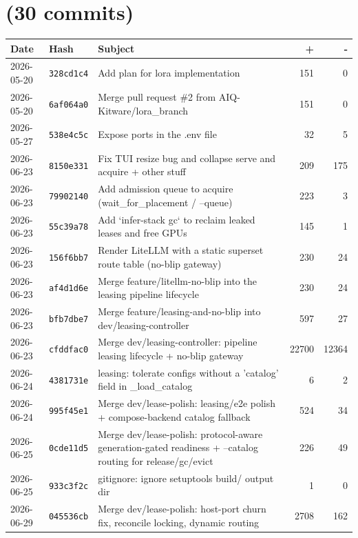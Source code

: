 \section*{ (30 commits)}
\begin{longtable}{@{}p{}p{}p{}r r@{}}
\toprule Date & Hash & Subject & + & - \\ \midrule\endhead
2026-05-20 & \texttt{328cd1c4} & Add plan for lora implementation & 151 & 0 \\
2026-05-20 & \texttt{6af064a0} & Merge pull request \#2 from AIQ-Kitware/lora\_branch & 151 & 0 \\
2026-05-27 & \texttt{538e4c5c} & Expose ports in the .env file & 32 & 5 \\
2026-06-23 & \texttt{8150e331} & Fix TUI resize bug and collapse serve and acquire + other stuff & 209 & 175 \\
2026-06-23 & \texttt{79902140} & Add admission queue to acquire (wait\_for\_placement / --queue) & 223 & 3 \\
2026-06-23 & \texttt{55c39a78} & Add `infer-stack gc` to reclaim leaked leases and free GPUs & 145 & 1 \\
2026-06-23 & \texttt{156f6bb7} & Render LiteLLM with a static superset route table (no-blip gateway) & 230 & 24 \\
2026-06-23 & \texttt{af4d1d6e} & Merge feature/litellm-no-blip into the leasing pipeline lifecycle & 230 & 24 \\
2026-06-23 & \texttt{bfb7dbe7} & Merge feature/leasing-and-no-blip into dev/leasing-controller & 597 & 27 \\
2026-06-23 & \texttt{cfddfac0} & Merge dev/leasing-controller: pipeline leasing lifecycle + no-blip gateway & 22700 & 12364 \\
2026-06-24 & \texttt{4381731e} & leasing: tolerate configs without a 'catalog' field in \_load\_catalog & 6 & 2 \\
2026-06-24 & \texttt{995f45e1} & Merge dev/lease-polish: leasing/e2e polish + compose-backend catalog fallback & 524 & 34 \\
2026-06-25 & \texttt{0cde11d5} & Merge dev/lease-polish: protocol-aware generation-gated readiness + --catalog routing for release/gc/evict & 226 & 49 \\
2026-06-25 & \texttt{933c3f2c} & gitignore: ignore setuptools build/ output dir & 1 & 0 \\
2026-06-29 & \texttt{045536cb} & Merge dev/lease-polish: host-port churn fix, reconcile locking, dynamic routing & 2708 & 162 \\

\end{longtable}
